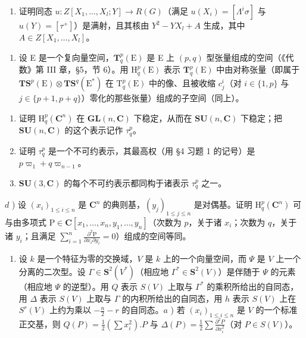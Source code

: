 \begin{enumerate}
\begin{enumerate}
\def\labelenumi{\alph{enumi})}
\setcounter{enumi}{4}
\tightlist
\item
  证明同态 \(u : Z[X_{1}, \ldots, X_{l}; Y] \to R(G)\)（满足 \(u(X_{i}) = [\Lambda^{i} \sigma]\) 与 \(u(Y) = [\tau^{+}]\)）是满射，且其核由 \(Y^{2} - YX_{l} + A\) 生成，其中 \(A \in Z[X_{1}, \ldots, X_{l}]\)。
\end{enumerate}

\begin{enumerate}
\def\labelenumi{\arabic{enumi})}
\setcounter{enumi}{3}
\tightlist
\item
  设 E 是一个复向量空间，\(\mathbf{T}_{q}^{p}(\mathrm{E})\) 是 E 上 \((p,q)\) 型张量组成的空间（《代数》第 III 章，§5，节 6）。用 \(\mathrm{H}_{q}^{p}(\mathrm{E})\) 表示 \(\mathbf{T}_{q}^{p}(\mathrm{E})\) 中由对称张量（即属于 \(\mathbf{T}\mathbf{S}^{p}(\mathrm{E})\otimes\mathbf{T}\mathbf{S}^{q}(\mathrm{E}^{*})\) 在 \(\mathrm{T}_{q}^{p}(\mathrm{E})\) 中的像、且被收缩 \(c_{j}^{i}\)（对 \(i\in\{1,p\}\) 与 \(j\in\{p+1,p+q\}\)）零化的那些张量）组成的子空间（同上）。
\end{enumerate}

\begin{enumerate}
\def\labelenumi{\alph{enumi})}
\item
  证明 \(\mathrm{H}_{q}^{p}(\mathbf{C}^{n})\) 在 \(\mathbf{GL}(n,\mathbf{C})\) 下稳定，从而在 \(\mathbf{SU}(n,\mathbf{C})\) 下稳定；把 \(\mathbf{SU}(n,\mathbf{C})\) 的这个表示记作 \(\tau_{q}^{p}\)。
\item
  证明 \(\tau_q^p\) 是一个不可约表示，其最高权（用 §4 习题 1 的记号）是 \(p\varpi_1 + q\varpi_{n - 1}\)。
\item
  \(\mathbf{SU}(3,\mathbf{C})\) 的每个不可约表示都同构于诸表示 \(\tau_q^p\) 之一。
\end{enumerate}

\(d\) ) 设 \((x_{i})_{1\leq i\leq n}\) 是 \(\mathbf{C}^n\) 的典则基，\((y_{j})_{1\leq j\leq n}\) 是对偶基。证明 \(\mathrm{H}_q^p (\mathbf{C}^n)\) 可与由多项式 \(\mathrm{P}\in \mathbf{C}[x_1,\ldots ,x_n,y_1,\ldots ,y_n]\)（次数为 \(p\)，关于诸 \(x_{i}\)；次数为 \(q\)，关于诸 \(y_{i}\)；且满足 \(\sum_{i = 1}^{n}\frac{\partial^2\mathrm{P}}{\partial x_i\partial y_i} = 0\)）组成的空间等同。

\begin{enumerate}
\def\labelenumi{\arabic{enumi})}
\setcounter{enumi}{4}
\tightlist
\item
  设 \(k\) 是一个特征为零的交换域，\(V\) 是 \(k\) 上的一个向量空间，而 \(\varPsi\) 是 \(V\) 上一个分离的二次型。设 \(\varGamma \in \mathbf{S}^2(V^*)\)（相应地 \(\varGamma^* \in \mathbf{S}^2(V)\)）是伴随于 \(\varPsi\) 的元素（相应地 \(\varPsi\) 的逆型）。用 \(Q\) 表示 \(S(V)\) 上取与 \(\varGamma^*\) 的乘积所给出的自同态，用 \(\varDelta\) 表示 \(S(V)\) 上取与 \(\varGamma\) 的内积所给出的自同态，用 \(h\) 表示 \(S(V)\) 上在 \(S^r(V)\) 上约为乘以 \(-\frac{n}{2} - r\) 的自同态。\(a\) ) 若 \((x_i)_{1\leq i\leq n}\) 是 \(V\) 的一个标准正交基，则 \(Q(P) = \frac{1}{2}\left(\sum x_i^2\right).P\) 与 \(\varDelta(P) = \frac{1}{2}\sum \frac{\partial^2P}{\partial x_i^2}\)（对 \(P \in S(V)\)）。
\end{enumerate}


\end{enumerate}
